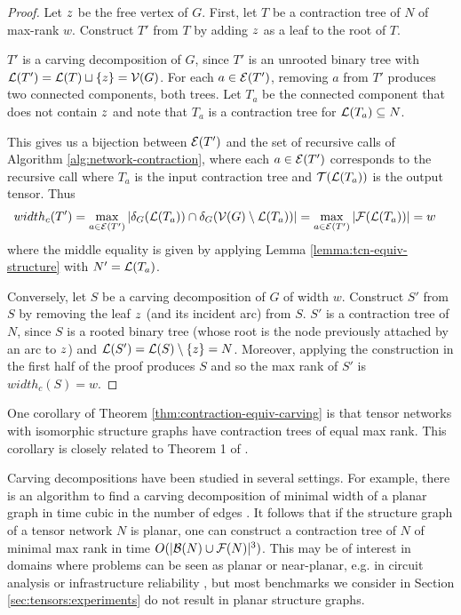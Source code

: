 \begin{proof}
Let $z$ be the free vertex of $G$. First, let $T$ be a contraction tree of $N$ of max-rank $w$. Construct $T'$ from $T$ by adding $z$ as a leaf to the root of $T$. 

$T'$ is a carving decomposition of $G$, since $T'$ is an unrooted binary tree with $\mathcal{L}(T') = \mathcal{L}(T) \sqcup \{z\} = \mathcal{V}(G)$. 
For each $a \in \mathcal{E}(T')$, removing $a$ from $T'$ produces two connected components, both trees. Let $T_a$ be the connected component that does not contain $z$ and note that $T_a$ is a contraction tree for $\mathcal{L}(T_a) \subseteq N$. 

This gives us a bijection between $\mathcal{E}(T')$ and the set of recursive calls of Algorithm \ref{alg:network-contraction}, where each $a \in \mathcal{E}(T')$ corresponds to the recursive call where $T_a$ is the input contraction tree and $\mathcal{T}(\mathcal{L}(T_a))$ is the output tensor. Thus
\begin{align*}
&width_c(T') = \max_{a \in \mathcal{E}(T')} \left| \delta_{G}(\mathcal{L}(T_a)) \cap \delta_{G}(\mathcal{V}(G) \setminus \mathcal{L}(T_a)) \right| = \max_{a \in \mathcal{E}(T')} \left| \mathcal{F}(\mathcal{L}(T_a)) \right| = w
\end{align*}
where the middle equality is given by applying Lemma \ref{lemma:tcn-equiv-structure} with $N' = \mathcal{L}(T_a)$.

Conversely, let $S$ be a carving decomposition of $G$ of width $w$. Construct $S'$ from $S$ by removing the leaf $z$ (and its incident arc) from $S$. $S'$ is a contraction tree of $N$, since $S$ is a rooted binary tree (whose root is the node previously attached by an arc to $z$) and $\mathcal{L}(S') = \mathcal{L}(S) \setminus \{z\} = N$. Moreover, applying the construction in the first half of the proof produces $S$ and so the max rank of $S'$ is $width_c(S) = w$.
\end{proof}

One corollary of Theorem \ref{thm:contraction-equiv-carving} is that tensor networks with isomorphic structure graphs have contraction trees of equal max rank. This corollary is closely related to Theorem 1 of \cite{EP14}.

Carving decompositions have been studied in several settings. For example, there is an algorithm to find a carving decomposition of minimal width of a planar graph in time cubic in the number of edges \cite{GT08}. It follows that if the structure graph of a tensor network $N$ is planar, one can construct a contraction tree of $N$ of minimal max rank in time $O(|\mathcal{B}(N) \cup \mathcal{F}(N)|^3)$. This may be of interest in domains where problems can be seen as planar or near-planar, e.g. in circuit analysis or infrastructure reliability \cite{MS08,DLVR18}, but most benchmarks we consider in Section \ref{sec:tensors:experiments} do not result in planar structure graphs.

